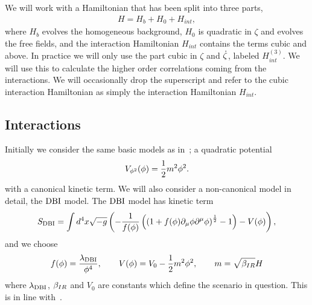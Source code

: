     We will work with a Hamiltonian that has been split into three parts,
    \begin{align}
        H = H_b + H_0 + H_{int},
    \end{align}
    where $H_b$ evolves the homogeneous background, $H_0$ is quadratic in $\zeta$ and evolves the free
    fields, and the interaction Hamiltonian $H_{int}$ contains the terms cubic and above.
    In practice we will only use the part cubic in $\zeta$ and $\dot{\zeta}$,
    labeled $H_{int}^{(3)}$. We will use this to calculate
    the higher order correlations coming from the interactions. We will occasionally drop the superscript and
    refer to the cubic interaction Hamiltonian as simply the interaction Hamiltonian $H_{int}$.


    \subsection{Interactions}\label{sec:interactions}
Initially we consider the same basic models as in~\cite{Funakoshi};
a quadratic potential
\begin{align}\label{eq:quadratic_potential}
    V_{\phi^2}(\phi) = \frac{1}{2}m^2\phi^2.
\end{align}
with a canonical kinetic term.
We will also consider a non-canonical model in detail, the $\text{DBI}$ model.
    The $\text{DBI}$ model has kinetic term
\begin{align}\label{eq:dbi_action}
    S_{\text{DBI}}=\int d^4x\sqrt{-g}\left(-\frac{1}{f(\phi)}\left(\left(1+f(\phi)\partial_\mu\phi\partial^\mu\phi\right)^{\frac{1}{2}}-1\right)-V(\phi)\right),
\end{align}
and we choose
\begin{align}\label{eq:dbi_warp}
    f(\phi)=\frac{\lambda_{\text{DBI}}}{\phi^4},\qquad
    V(\phi)=V_0-\frac{1}{2}m^2\phi^2,\qquad
    m=\sqrt{\beta_{IR}}H
\end{align}
where $\lambda_{\text{DBI}}$, $\beta_{IR}$ and $V_0$ are constants
which define the scenario in question.
This is in line with~\cite{Bean_ir_dbi, Chen_dbi}.


